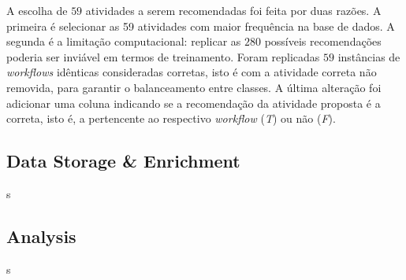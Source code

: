 \documentclass[10pt]{article}
\begin{document}
A escolha de \(59\) atividades a serem recomendadas foi feita por duas razões. A primeira é selecionar as 59 atividades com maior frequência na base de dados. A segunda é a limitação computacional: replicar as \(280\) possíveis recomendações poderia ser inviável em termos de treinamento. Foram replicadas \(59\) instâncias de \emph{workflows} idênticas consideradas corretas, isto é com a atividade correta não removida, para garantir o balanceamento entre classes. A última alteração foi adicionar uma coluna indicando se a recomendação da atividade proposta é a correta, isto é, a pertencente ao respectivo \emph{workflow} (\emph{T}) ou não (\emph{F}).

\subsection*{Data Storage \& Enrichment}\label{sec:enrich}
s

\subsection*{Analysis} \label{sec:analysis}
s


\newcommand{\boy}{\textordmasculine}
\end{document}
